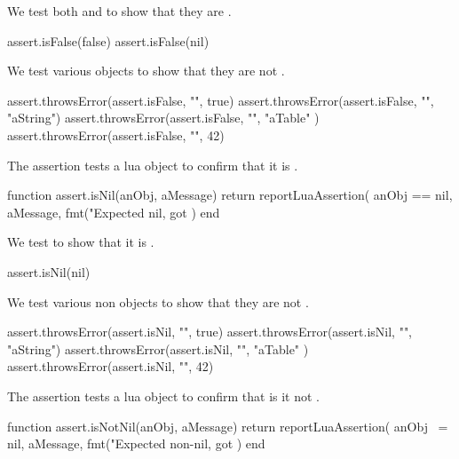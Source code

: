 
We test both  and  to show that they are 
. 

\startLuaTest
  assert.isFalse(false)
  assert.isFalse(nil)
\stopLuaTest
\stopTestCase


We test various objects to show that they are not .

\startLuaTest
  assert.throwsError(assert.isFalse, "", true)
  assert.throwsError(assert.isFalse, "", "aString")
  assert.throwsError(assert.isFalse, "", { "aTable" })
  assert.throwsError(assert.isFalse, "", 42)
\stopLuaTest
\stopTestCase

\stopTestSuite


The  assertion tests a lua object to confirm that it is 
. 

\startLuaCode
function assert.isNil(anObj, aMessage)
  return reportLuaAssertion(
    anObj == nil,
    aMessage,
    fmt("Expected nil, got %
  )
end
\stopLuaCode


We test  to show that it is . 

\startLuaTest
  assert.isNil(nil)
\stopLuaTest
\stopTestCase


We test various non  objects to show that they are not 
. 

\startLuaTest
  assert.throwsError(assert.isNil, "", true)
  assert.throwsError(assert.isNil, "", "aString")
  assert.throwsError(assert.isNil, "", { "aTable" })
  assert.throwsError(assert.isNil, "", 42)
\stopLuaTest
\stopTestCase

\stopTestSuite


The  assertion tests a lua object to confirm that is 
it not . 

\startLuaCode
function assert.isNotNil(anObj, aMessage)
  return reportLuaAssertion(
    anObj ~= nil,
    aMessage,
    fmt("Expected non-nil, got %
  )
end
\stopLuaCode


